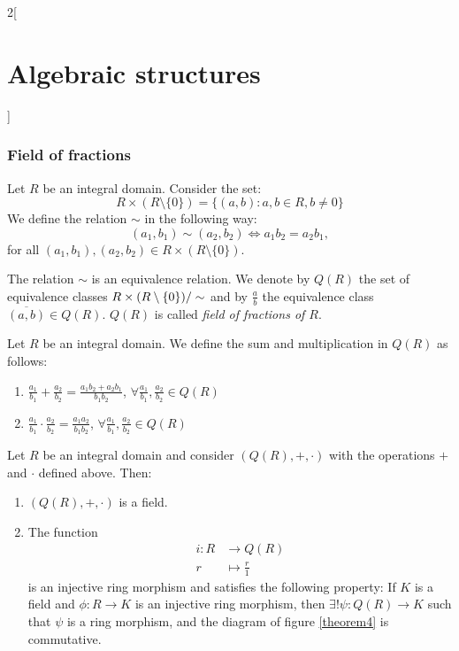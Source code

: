 \documentclass[../../../main.tex]{subfiles}
\begin{document}
\begin{multicols}{2}[\section{Algebraic structures}]
    \subsubsection*{Field of fractions}
    \begin{definition}
        Let $R$ be an integral domain. Consider the set: $$R\times(R\setminus\{0\})=\{(a,b):a,b\in R,b\ne 0\}$$ We define the relation $\sim$ in the following way: $$(a_1,b_1)\sim(a_2,b_2)\iff a_1b_2=a_2b_1,$$ for all $(a_1,b_1),(a_2,b_2)\in R\times(R\setminus\{0\})$.
    \end{definition}
    \begin{lemma}
        The relation $\sim$ is an equivalence relation. We denote by $Q(R)$ the set of equivalence classes $\quot{R\times(R\setminus\{0\})}{\sim}$ and by $\frac{a}{b}$ the equivalence class $\overline{(a,b)}\in Q(R)$. $Q(R)$ is called \textit{field of fractions of $R$}.
    \end{lemma}
    \begin{definition}
        Let $R$ be an integral domain. We define the sum and multiplication in $Q(R)$ as follows:
        \begin{enumerate}
            \item $\frac{a_1}{b_1}+\frac{a_2}{b_2}=\frac{a_1b_2+a_2b_1}{b_1b_2}$, $\forall\frac{a_1}{b_1},\frac{a_2}{b_2}\in Q(R)$
            \item $\frac{a_1}{b_1}\cdot\frac{a_2}{b_2}=\frac{a_1a_2}{b_1b_2}$, $\forall\frac{a_1}{b_1},\frac{a_2}{b_2}\in Q(R)$
        \end{enumerate}
    \end{definition}
    \begin{theorem}
        Let $R$ be an integral domain and consider $(Q(R),+,\cdot)$ with the operations $+$ and $\cdot$ defined above. Then:
        \begin{enumerate}
            \item $(Q(R),+,\cdot)$ is a field.
            \item The function
                  \begin{align*}
                      i:R & \longrightarrow Q(R)    \\
                      r   & \longmapsto \frac{r}{1}
                  \end{align*}
                  is an injective ring morphism and satisfies the following property: If $K$ is a field and $\phi:R\rightarrow K$ is an injective ring morphism, then $\exists!\psi:Q(R)\rightarrow K$ such that $\psi$ is a ring morphism, and the diagram of figure \ref{theorem4} is commutative.
        \end{enumerate}
        \begin{center}
            \begin{minipage}{\linewidth}
                \centering
                
                \label{theorem4}
            \end{minipage}
        \end{center}
    \end{theorem}

\end{multicols}
\end{document}
